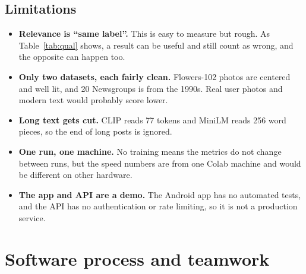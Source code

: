 \documentclass{article}
\begin{document}
\subsection{Limitations}

\begin{itemize}
  \item \textbf{Relevance is ``same label''.} This is easy to measure but rough. As Table~\ref{tab:qual} shows, a result can be useful and still count as wrong, and the opposite can happen too.
  \item \textbf{Only two datasets, each fairly clean.} Flowers-102 photos are centered and well lit, and 20 Newsgroups is from the 1990s. Real user photos and modern text would probably score lower.
  \item \textbf{Long text gets cut.} CLIP reads 77 tokens and MiniLM reads 256 word pieces, so the end of long posts is ignored.
  \item \textbf{One run, one machine.} No training means the metrics do not change between runs, but the speed numbers are from one Colab machine and would be different on other hardware.
  \item \textbf{The app and API are a demo.} The Android app has no automated tests, and the API has no authentication or rate limiting, so it is not a production service.
\end{itemize}

\section{Software process and teamwork}
\end{document}
